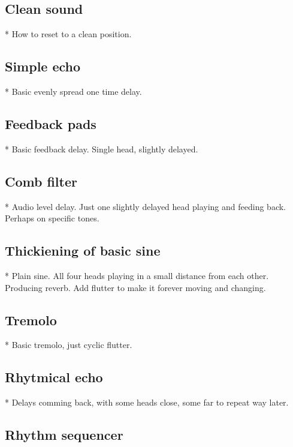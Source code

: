 \documentclass[11pt]{article}
\begin{document}
\newpage


\subsection{Clean sound}

* How to reset to a clean position.

\subsection{Simple echo}

* Basic evenly spread one time delay.

\subsection{Feedback pads}

* Basic feedback delay. Single head, slightly delayed.

\subsection{Comb filter}

* Audio level delay. Just one slightly delayed head playing and feeding back.
  Perhaps on specific tones.

\subsection{Thickiening of basic sine}

* Plain sine. All four heads playing in a small distance from each other.
  Producing reverb. Add flutter to make it forever moving and changing.

\subsection{Tremolo}

* Basic tremolo, just cyclic flutter.

\subsection{Rhytmical echo}

* Delays comming back, with some heads close, some far to repeat way later.

\subsection{Rhythm sequencer}
\end{document}
